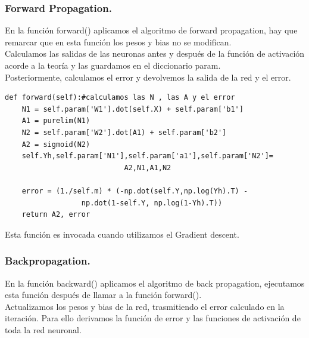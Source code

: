 \documentclass[a4paper,11pt]{article}
\begin{document}
\subsubsection{Forward Propagation.}

En la función forward() aplicamos el algoritmo de forward propagation, hay que remarcar que en esta función los pesos y bias no se modifican.\\ 

\noindent
Calculamos las salidas de las neuronas antes y después de la función de activación acorde a la teoría y las guardamos en el diccionario param.\\

\noindent
Posteriormente, calculamos el error y devolvemos la salida de la red y el error.
\begin{lstlisting}
def forward(self):#calculamos las N , las A y el error
    N1 = self.param['W1'].dot(self.X) + self.param['b1']
    A1 = purelim(N1)
    N2 = self.param['W2'].dot(A1) + self.param['b2']
    A2 = sigmoid(N2)
    self.Yh,self.param['N1'],self.param['a1'],self.param['N2']=
						    A2,N1,A1,N2

    error = (1./self.m) * (-np.dot(self.Y,np.log(Yh).T) - 
			      np.dot(1-self.Y, np.log(1-Yh).T))
    return A2, error
\end{lstlisting}
Esta función es invocada cuando utilizamos el Gradient descent.
\subsubsection{Backpropagation.}

En la función backward() aplicamos el algoritmo de back propagation, ejecutamos esta función después de llamar a la función forward(). \\

\noindent
Actualizamos los pesos y bias de la red, trasmitiendo el error calculado en la iteración. Para ello derivamos la función de error y las funciones de activación de toda la red neuronal. \\
\end{document}
